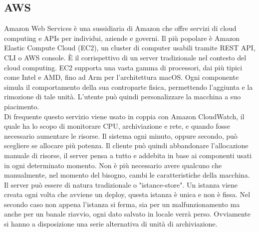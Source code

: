 \documentclass[12pt]{article}
\begin{document}
\subsection{AWS}
Amazon Web Services è una sussidiaria di Amazon che offre servizi di cloud 
computing e APIs per individui, aziende e governi.
Il più popolare è Amazon Elastic Compute Cloud (EC2), 
un cluster di computer usabili tramite REST API, CLI o AWS console.
È il corrispettivo di un server tradizionale nel contesto del cloud computing. 
EC2 supporta una vasta gamma di processori, dai più tipici come Intel e AMD, 
fino ad Arm per l'architettura macOS.
Ogni componente simula il comportamento della sua controparte fisica, permettendo 
l'aggiunta e la rimozione di tale unità. 
L'utente può quindi personalizzare la macchina a suo piacimento. 
\\ Di frequente questo servizio viene usato in coppia con Amazon CloudWatch,
il quale ha lo scopo di monitorare CPU, archiviazione e rete, e quando fosse 
necessario aumentare le risorse.
Il sistema ogni minuto, oppure secondo, può scegliere se allocare più 
potenza.
Il cliente può quindi abbandonare l'allocazione manuale di risorse, il server 
pensa a tutto e addebita in base ai componenti usati in ogni determinato momento. 
Non è più necessario avere qualcuno che manualmente, nel momento del bisogno, 
cambi le caratteristiche della macchina.
\\ Il server può essere di natura tradizionale o "istance-store". 
Un istanza viene creata ogni volta che avviene un deploy, questa istanza è 
unica e non è fissa.
Nel secondo caso non appena l'istanza si ferma, sia per un malfunzionamento 
ma anche per un banale riavvio, ogni dato salvato in locale verrà perso. 
Ovviamente si hanno a disposizione una serie alternativa di unità di archiviazione.
\end{document}
